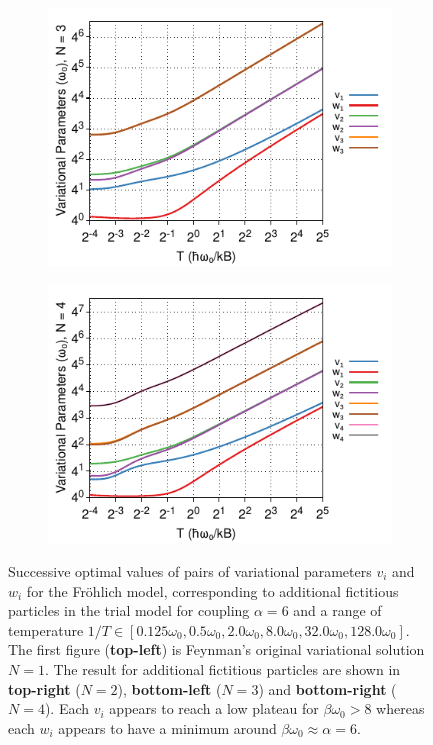 \begin{figure}[!tbp]
\begin{subfigure}[b]{0.49\textwidth}
    \centering
    \includegraphics[width=\textwidth]{figures/frohlich-3d-multivariate-vw-alpha-7-temp-00325to32-N-3-COLOUR.pdf}
  \end{subfigure}
  \begin{subfigure}[b]{0.49\textwidth}
    \centering
    \includegraphics[width=\textwidth]{figures/frohlich-3d-multivariate-vw-alpha-7-temp-00325to32-N-4-COLOUR.pdf}
  \end{subfigure}
  \caption{Successive optimal values of pairs of variational parameters $v_i$ and $w_i$ for the Fr\"ohlich model, corresponding to additional fictitious particles in the trial model for coupling $\alpha = 6$ and a range of temperature $1/T \in [0.125 \omega_0, 0.5 \omega_0, 2.0 \omega_0, 8.0 \omega_0, 32.0 \omega_0, 128.0 \omega_0]$. The first figure (\textbf{top-left}) is Feynman's original variational solution $N=1$. The result for additional fictitious particles are shown in \textbf{top-right} ($N=2$), \textbf{bottom-left} ($N=3$) and \textbf{bottom-right} ($N=4$). Each $v_i$ appears to reach a low plateau for $\beta \omega_0 > 8$ whereas each $w_i$ appears to have a minimum around $\beta\omega_0 \approx \alpha = 6$.}
  \label{fig:multivwbeta}
\end{figure}

